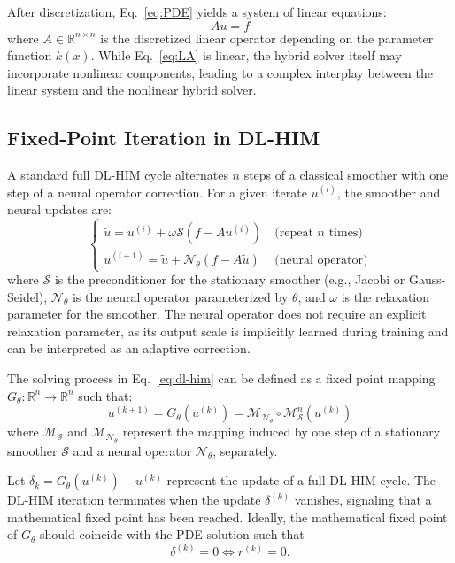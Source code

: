 \documentclass[11pt]{article}
\begin{document}
After discretization, Eq.~\eqref{eq:PDE} yields a system of linear equations:
\begin{equation}
    Au = f
    \label{eq:LA}
\end{equation}
where $A\in\mathbb R^{n\times n}$ is the discretized linear operator depending on the parameter function $k(x)$. While Eq.~\eqref{eq:LA} is linear, the hybrid solver itself may incorporate nonlinear components, leading to a complex interplay between the linear system and the nonlinear hybrid solver.

\subsection{Fixed-Point Iteration in DL-HIM}
A standard full DL-HIM cycle alternates $n$ steps of a classical smoother with one step of a neural operator correction. For a given iterate $u^{(i)}$, the smoother and neural updates are:
\begin{equation}\label{eq:dl-him}
    \begin{cases}
        \tilde u = u^{(i)} + \omega \mathcal{S}(f - A u^{(i)}) \      & {\text{(repeat $n$ times)}} \\
        u^{(i+1)} = \tilde u + \mathcal{N_\theta} (f - A \tilde u) \  & {\text{(neural operator)}}
    \end{cases}
\end{equation}
where $\mathcal S$ is the preconditioner for the stationary smoother (e.g., Jacobi or Gauss-Seidel), $\mathcal{N}_\theta$ is the neural operator parameterized by $\theta$, and $\omega$ is the relaxation parameter for the smoother. The neural operator does not require an explicit relaxation parameter, as its output scale is implicitly learned during training and can be interpreted as an adaptive correction.

The solving process in Eq.~\eqref{eq:dl-him} can be defined as a fixed point mapping $G_\theta: \mathbb R^n\to \mathbb R^n$ such that:
\begin{equation}
    u^{(k+1)} = G_\theta(u^{(k)}) = \mathcal{M}_{\mathcal{N}_\theta} \circ \mathcal{M}_{\mathcal{S}}^n (u^{(k)})
    \label{eq:fixed_point_map}
\end{equation}
where $\mathcal{M}_{\mathcal{S}}$ and $\mathcal{M}_{\mathcal{N}_\theta}$ represent the mapping induced by one step of a stationary smoother $\mathcal S$ and a neural operator $\mathcal{N}_\theta$, separately.

Let $\delta_k = G_\theta(u^{(k)}) - u^{(k)}$ represent the update of a full DL-HIM cycle. The DL-HIM iteration terminates when the update $\delta^{(k)}$ vanishes, signaling that a mathematical fixed point has been reached. Ideally, the mathematical fixed point of $G_\theta$ should coincide with the PDE solution such that
$$
    \delta^{(k)} = 0 \iff r^{(k)} = 0.
$$
\end{document}

